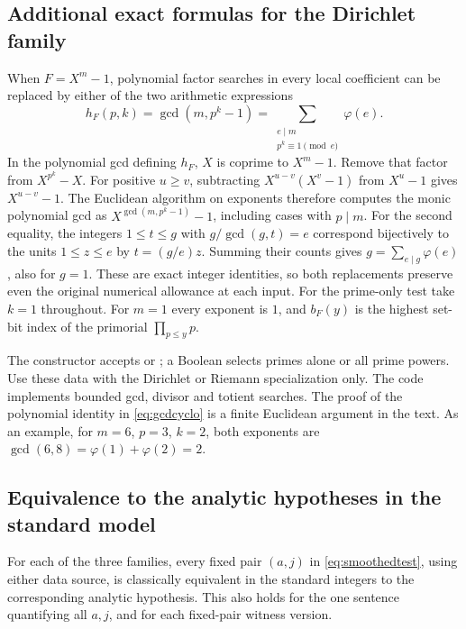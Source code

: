\subsection*{Additional exact formulas for the Dirichlet family}

When $F=X^m-1$, polynomial factor searches in every local coefficient can be replaced by either of the two arithmetic expressions
\begin{equation}\label{eq:gcdcyclo}
 h_F(p,k)=\gcd(m,p^k-1)=
 \sum_{\substack{e\mid m\\p^k\equiv1\pmod e}}\varphi(e).
\end{equation}
In the polynomial gcd defining $h_F$, $X$ is coprime to $X^m-1$. Remove that factor from $X^{p^k}-X$. For positive $u\ge v$, subtracting $X^{u-v}(X^v-1)$ from $X^u-1$ gives $X^{u-v}-1$. The Euclidean algorithm on exponents therefore computes the monic polynomial gcd as $X^{\gcd(m,p^k-1)}-1$, including cases with $p\mid m$. For the second equality, the integers $1\le t\le g$ with $g/\gcd(g,t)=e$ correspond bijectively to the units $1\le z\le e$ by $t=(g/e)z$. Summing their counts gives $g=\sum_{e\mid g}\varphi(e)$, also for $g=1$. These are exact integer identities, so both replacements preserve even the original numerical allowance at each input. For the prime-only test take $k=1$ throughout. For $m=1$ every exponent is $1$, and $b_F(y)$ is the highest set-bit index of the primorial $\prod_{p\le y}p$.

The constructor  accepts  or ; a Boolean selects primes alone or all prime powers. Use these data with the Dirichlet or Riemann specialization only. The code implements bounded gcd, divisor and totient searches. The proof of the polynomial identity in \eqref{eq:gcdcyclo} is a finite Euclidean argument in the text. As an example, for $m=6$, $p=3$, $k=2$, both exponents are $\gcd(6,8)=\varphi(1)+\varphi(2)=2$.

\subsection*{Equivalence to the analytic hypotheses in the standard model}

\begin{theorem}\label{thm:smoothing}
For each of the three families, every fixed pair $(a,j)$ in \eqref{eq:smoothedtest}, using either data source, is classically equivalent in the standard integers to the corresponding analytic hypothesis. This also holds for the one sentence quantifying all $a,j$, and for each fixed-pair witness version.
\end{theorem}

